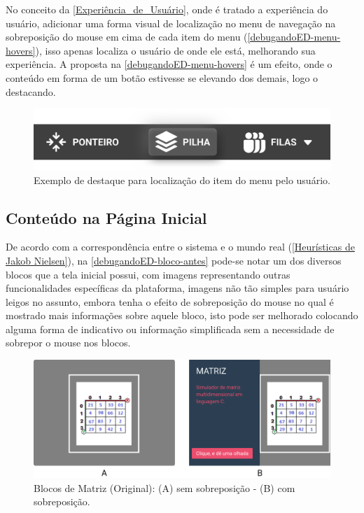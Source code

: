 No conceito da \autoref{Experiência_de_Usuário}, onde é tratado a experiência do usuário, adicionar uma forma visual de localização no menu de navegação na sobreposição do mouse em cima de cada item do menu (\autoref{debugandoED-menu-hovers}), isso apenas localiza o usuário de onde ele está, melhorando sua experiência. A proposta na \autoref{debugandoED-menu-hovers} é um efeito, onde o conteúdo em forma de um botão estivesse se elevando dos demais, logo o destacando.

\begin{figure}[htb]
    \begin{center}
        \includegraphics[scale=1]{figs/debugandoED-menu-hover.png}
    \end{center}
    \caption{\label{debugandoED-menu-hovers}Exemplo de destaque para localização do item do menu pelo usuário.}
\end{figure}

\subsection{Conteúdo na Página Inicial}
\label{Conteúdo_na_Pagina_Inicial}

De acordo com a correspondência entre o sistema e o mundo real (\autoref{Heurísticas de Jakob Nielsen}), na \autoref{debugandoED-bloco-antes} pode-se notar um dos diversos blocos que a tela inicial possui, com imagens representando outras funcionalidades específicas da plataforma, imagens não tão simples para usuário leigos no assunto, embora tenha o efeito de sobreposição do mouse no qual é mostrado mais informações sobre aquele bloco, isto pode ser melhorado colocando alguma forma de indicativo ou informação simplificada sem a necessidade de sobrepor o mouse nos blocos.
    
\begin{figure}[htb]
    \begin{center}
	    \includegraphics[scale=0.52]{figs/debugandoED-bloco-antes.png}
	\end{center}
    \caption{\label{debugandoED-bloco-antes}Blocos de Matriz (Original): (A) sem sobreposição - (B) com sobreposição.}
\end{figure}
    
